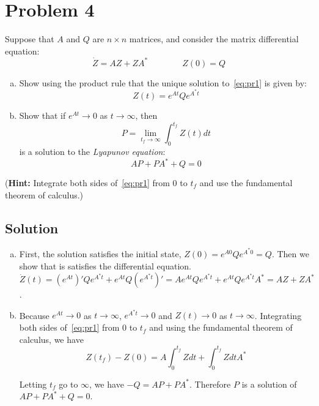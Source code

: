 \documentclass[11pt]{report}
\theoremstyle{definition}
\begin{document}
\section*{Problem 4}
Suppose that $A$ and $Q$ are $n \times n$ matrices, and consider the matrix differential equation:
\begin{equation}
\label{eq:pr1}
\dot Z = AZ + Z A^* \qquad \qquad Z(0) = Q
\end{equation}
\begin{enumerate}[(a), noitemsep]
\item  Show using the product rule that the unique solution to~\eqref{eq:pr1} is given by:
\[
Z(t) = e^{At} Q e^{A^* t}
\]
\item Show that if $e^{At} \rightarrow 0$ as $t \rightarrow \infty$, then
\[
P = \lim_{t_f \rightarrow \infty} \int_0^{t_f} Z(t) dt
\]
is a solution to the {\em Lyapunov equation}:
\[
AP + PA^* + Q = 0
\]
\end{enumerate}
\justify
({\bf Hint:} Integrate both sides of~\eqref{eq:pr1} from $0$ to $t_f$ and use the fundamental theorem of calculus.)





\subsection*{Solution}

\begin{enumerate}[(a), noitemsep]
\item
First, the solution satisfies the initial state, $Z(0) = e^{A0} Q e^{A^* 0} = Q$. Then we show that is satisfies the differential equation. $\dot{Z}(t) = (e^{At})' Q e^{A^* t} + e^{At} Q (e^{A^* t})' = A e^{At} Q e^{A^* t} + e^{At} Q e^{A^* t} A^* = AZ+ZA^*$.

\item
Because $e^{At} \rightarrow 0$ as $t \rightarrow \infty$, $e^{A^* t} \rightarrow 0$ and $Z(t) \rightarrow 0$ as $t \rightarrow \infty$. Integrating both sides of~\eqref{eq:pr1} from $0$ to $t_f$ and using the fundamental theorem of calculus, we have
$$Z(t_f) - Z(0) = A\int_{0}^{t_f} Z dt + \int_{0}^{t_f} Z dt A^*$$

Letting $t_f$ go to $\infty$, we have $-Q = AP + PA^*$. Therefore $P$ is a solution of $AP+PA^*+Q=0$.

\end{enumerate}
\end{document}
